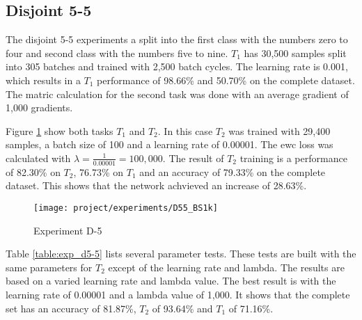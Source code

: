\newpage

\subsection{Disjoint 5-5}

The disjoint 5-5 experiments a split into the first class with the numbers zero to four and second class with the numbers five to nine.
$T_1$ has 30,500 samples split into 305 batches and trained with 2,500 batch cycles.
The learning rate is 0.001, which results in a $T_1$ performance of 98.66\% and 50.70\% on the complete dataset.
The matric calculation for the second task was done with an average gradient of 1,000 gradients.

Figure \ref{fig:exp_d5-5_bs1k} show both tasks $T_1$ and $T_2$.
In this case $T_2$ was trained with 29,400 samples, a batch size of 100 and a learning rate of 0.00001.
The \acrshort{ewc} loss was calculated with $\lambda = \frac{1}{0.00001} = 100,000$.
The result of $T_2$ training is a performance of 82.30\% on $T_2$, 76.73\% on $T_1$ and an accuracy of 79.33\% on the complete dataset.
This shows that the network achvieved an increase of 28.63\%.

\begin{figure}[H]
    \centering
    \texttt{[image: project/experiments/D55\_BS1k]}
    \caption{Experiment D-5}
    \label{fig:exp_d5-5_bs1k}
\end{figure}

\newpage

Table \ref{table:exp_d5-5} lists several parameter tests.
These tests are built with the same parameters for $T_2$ except of the learning rate and lambda.
The results are based on a varied learning rate and lambda value.
The best result is with the learning rate of 0.00001 and a lambda value of 1,000.
It shows that the complete set has an accuracy of 81.87\%, $T_2$ of 93.64\% and $T_1$ of 71.16\%.

